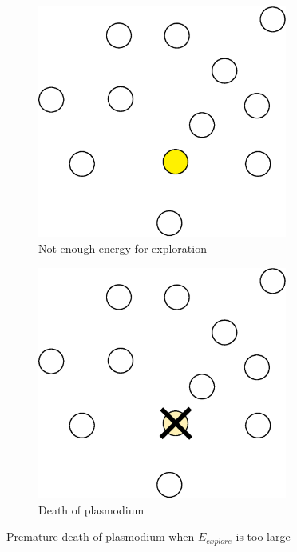 \documentclass[english,a4paper,twoside]{ppfcmthesis}
\begin{document}
\begin{figure}
  \centering

  \begin{subfigure}{0.3\textwidth}
    \centering
    \includegraphics[width=0.9\textwidth]{algorithm/metaheuristic/dead1.eps}
    \caption{Not enough energy for exploration}
  \end{subfigure}
  \begin{subfigure}{0.3\textwidth}
    \centering
    \includegraphics[width=0.9\textwidth]{algorithm/metaheuristic/dead2.eps}
    \caption{Death of plasmodium}
  \end{subfigure}

  \caption{Premature death of plasmodium when $E_{explore}$ is too large}
  \label{figure:m_explore_dead}
\end{figure}
\end{document}

